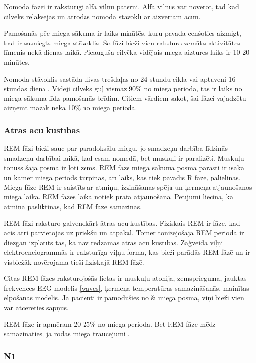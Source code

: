 \documentclass[12pt,paper=A4]{report}
\begin{document}
     Nomoda fāzei ir raksturīgi alfa viļņu paterni. Alfa viļņus var novērot, tad kad cilvēks relaksējas un atrodas nomoda stāvoklī ar aizvērtām acīm. 
    
    Pamošanās pēc miega sākuma ir laiks minūtēs, kuru pavada cenšoties aizmigt, kad ir sasniegts miega stāvoklis. Šo fāzi bieži vien raksturo zemāks aktivitātes līmenis nekā dienas laikā. Pieauguša cilvēka vidējais miega aiztures laiks ir 10-20 minūtes. 
    
    Nomoda stāvoklis sastāda divas trešdaļas no 24 stundu cikla vai aptuveni 16 stundas dienā \cite{SleepStagesSecure}. Vidēji cilvēks guļ vismaz 90\% no miega perioda, tas ir laiks no miega sākuma līdz pamošanās brīdim. Citiem vārdiem sakot, šai fāzei vajadzētu aizņemt mazāk nekā 10\% no miega perioda. 
          
\subsubsection{Ātrās acu kustības}

    REM fāzi bieži sauc par paradoksālu miegu, jo smadzeņu darbība līdzinās smadzeņu darbībai laikā, kad esam nomodā, bet muskuļi ir paralizēti. Muskuļu tonuss šajā posmā ir ļoti zems. REM fāze miega sākuma posmā parasti ir īsāka un kamēr miega periods turpinās, arī laiks, kas tiek pavadīs R fāzē, palielinās. Miega fāze REM ir saistīts ar atmiņu, izzināšanas spēju un ķermeņa atjaunošanos miega laikā. REM fāzes laikā notiek prāta atjaunošana. Pētījumi liecina, ka atmiņa pasliktinās, kad REM fāze samazinās. 
      
    REM fāzi raksturo galvenokārt ātras acu kustības. Fiziskais REM ir fāze, kad acis ātri pārvietojas uz priekšu un atpakaļ. Tomēr tonizējošajā REM periodā ir diezgan izplatīts tas, ka nav redzamas ātras acu kustības. Zāģveida viļņi elektroenciogrammās ir raksturīga viļņu forma, kas bieži parādās REM fāzē un ir visbiežāk novērojama tieši fiziskajā REM fāzē. 
    
    Citas REM fāzes raksturojošās lietas ir muskuļu atonija, zemsprieguma, jauktas frekvences EEG modelis \ref{waves}, ķermeņa temperatūras samazināšanās, mainītas elpošanas modelis. Ja pacienti ir pamodušies no šī miega posma, viņi bieži vien var atcerēties sapņus.
    
    REM fāze ir apmēram 20-25\% no miega perioda. Bet REM fāze mēdz samazināties, ja rodas miega traucējumi \cite{SleepStagesSecure}.
    
\subsubsection{N1}
   
\end{document}
